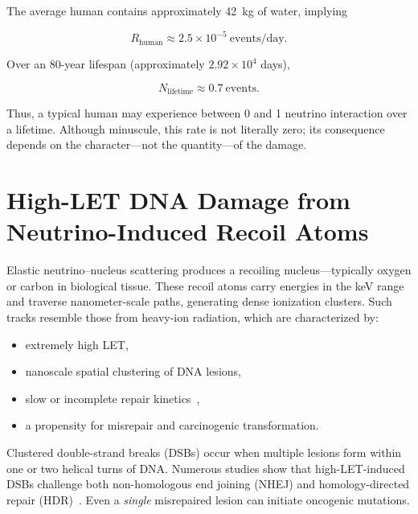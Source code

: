 \documentclass[12pt,a4paper]{article}
\begin{document}
The average human contains approximately 42~kg of water, implying

\begin{equation}
R_{\mathrm{human}} \approx
2.5\times10^{-5}\ \mathrm{events/day}.
\label{eq:rate_human}
\end{equation}

Over an 80-year lifespan (approximately $2.92\times10^{4}$ days),

\begin{equation}
N_{\mathrm{lifetime}}\approx 0.7\ \mathrm{events}.
\label{eq:lifetime}
\end{equation}

Thus, a typical human may experience between 0 and 1 neutrino interaction over a lifetime. Although minuscule, this rate is not literally zero; its consequence depends on the character---not the quantity---of the damage.

\section{High-LET DNA Damage from Neutrino-Induced Recoil Atoms}

Elastic neutrino--nucleus scattering produces a recoiling nucleus---typically oxygen or carbon in biological tissue. These recoil atoms carry energies in the keV range and traverse nanometer-scale paths, generating dense ionization clusters. Such tracks resemble those from heavy-ion radiation, which are characterized by:

\begin{itemize}
\item extremely high LET,
\item nanoscale spatial clustering of DNA lesions,
\item slow or incomplete repair kinetics~\cite{nickoloff2020,hagiwara2019},
\item a propensity for misrepair and carcinogenic transformation.
\end{itemize}

Clustered double-strand breaks (DSBs) occur when multiple lesions form within one or two helical turns of DNA. Numerous studies show that high-LET-induced DSBs challenge both non-homologous end joining (NHEJ) and homology-directed repair (HDR)~\cite{shibata2014,lorat2015}. Even a \textit{single} misrepaired lesion can initiate oncogenic mutations.
\end{document}
